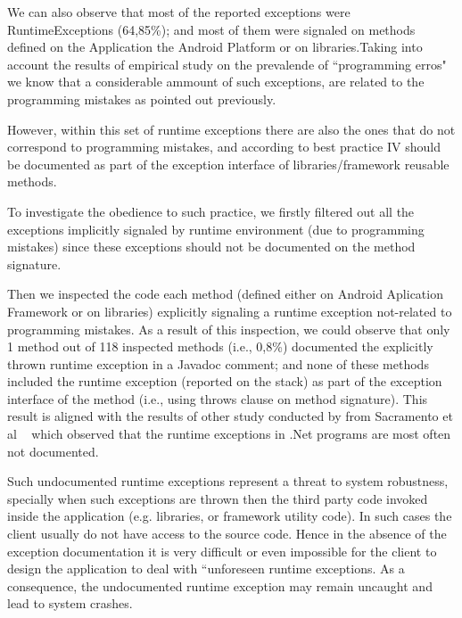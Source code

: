 \documentclass[conference]{IEEEtran}
\begin{document}
We can also observe that most of the reported exceptions were RuntimeExceptions
(64,85\%); and most of them were signaled on methods defined on the Application 
the Android Platform or on libraries.Taking into account the results of empirical study on 
the prevalende of ``programming erros" we know that a considerable ammount 
of such exceptions, are related to the programming mistakes
as pointed out previously.

However, within this set of runtime exceptions there are also the ones that do not correspond to programming mistakes,
and according to best practice IV should be documented as part of the exception interface of libraries/framework reusable
methods.

To investigate the obedience to such practice, we firstly filtered out all the exceptions implicitly
 signaled by  runtime environment (due to programming mistakes) since these exceptions 
should not be documented on the method signature. 

Then we inspected the code each method (defined either on Android  Aplication Framework or on libraries) 
explicitly signaling a runtime exception not-related to programming mistakes.
As a result of this inspection, we could observe that only 1 method out of 118 inspected methods
 (i.e., 0,8\%) documented the explicitly thrown runtime exception in a Javadoc comment; and none of these methods
included the runtime exception  (reported on the stack) as part of the exception interface of the method (i.e., using 
throws clause on method signature). This result is aligned with the results of other study conducted by from 
Sacramento et al ~\cite{sacramento2006unchecked} which observed that the
runtime exceptions in .Net programs are most often not documented.

Such undocumented runtime exceptions represent a threat to system robustness, specially
when such exceptions are thrown then the third party code invoked inside the application 
(e.g. libraries, or framework utility code). In such cases the client usually do not have access to 
the source code. Hence in the absence of the exception documentation it is very difficult or even impossible
 for the client to design the application to deal with ``unforeseen runtime exceptions. As a consequence, the
 undocumented runtime exception may remain uncaught and lead to system crashes.

\noindent {}
\end{document}
